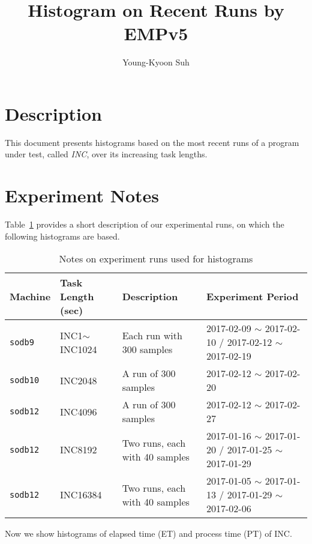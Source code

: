 \documentclass[10pt]{article}
\begin{document}
\title{Histogram on Recent Runs by EMPv5}

\author{
Young-Kyoon Suh\\
}
\maketitle

\section{Description}
This document presents histograms based on the most recent runs 
of a program under test, called {\em INC}, over its increasing task lengths. 

\section{Experiment Notes}
Table~\ref{tab:exp_notes} provides a short description of our experimental runs, 
on which the following histograms are based.

\begin{table}[h]
\begin{center}
\begin{tabular}{|p{2cm}|p{3cm}|p{6cm}|p{4cm}|} \hline
Machine & Task Length (sec) & Description & Experiment Period\\ \hline
{\tt sodb9} &  INC1$\sim$INC1024 & Each run with 300 samples & 2017-02-09 $\sim$ 2017-02-10 / 2017-02-12 $\sim$ 2017-02-19\\ \hline
{\tt sodb10} & INC2048 & A run of 300 samples & 2017-02-12 $\sim$ 2017-02-20\\ \hline
{\tt sodb12} & INC4096 & A run of 300 samples & 2017-02-12 $\sim$ 2017-02-27\\ \hline
{\tt sodb12} & INC8192 & Two runs, each with 40 samples & 2017-01-16 $\sim$ 2017-01-20 / 2017-01-25 $\sim$ 2017-01-29\\ \hline
{\tt sodb12} & INC16384 & Two runs, each with 40 samples & 2017-01-05 $\sim$ 2017-01-13 / 2017-01-29 $\sim$ 2017-02-06\\ \hline 
\end{tabular}
\end{center}
\vspace{-.2in}
\caption{Notes on experiment runs used for histograms\label{tab:exp_notes}}
\end{table}

Now we show histograms of elapsed time (ET) and process time (PT) of INC. 

\newpage


\end{document}
